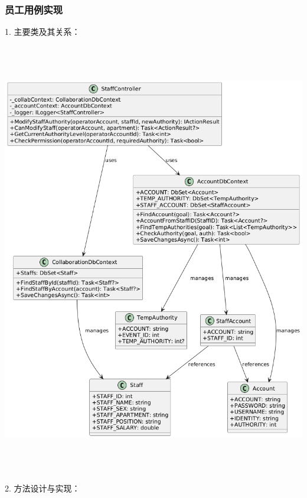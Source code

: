 \documentclass[]{article}
\begin{document}
\hypertarget{ux5458ux5de5ux7528ux4f8bux5b9eux73b0}{%
  \subsubsection{员工用例实现}\label{ux5458ux5de5ux7528ux4f8bux5b9eux73b0}}

1. 主要类及其关系：

\includegraphics[width=6.23958in,height=7.50903in]{media/media/image14.png}

2. 方法设计与实现：
\end{document}
